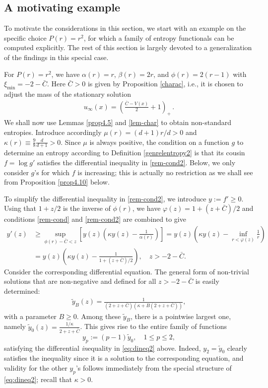 \documentclass[reqno]{amsart}
\begin{document}
\subsection{A motivating example}
\label{sct:xmp-pme2}
To motivate the considerations in this section, we start with an example on the specific choice $P(r)=r^2$, for which a family of entropy functionals can be computed explicitly. The rest of this section is largely devoted to a generalization of the findings in this special case.

For $P(r)=r^2$, we have $\alpha(r)=r$, $\beta(r)=2r$, and $\phi(r)=2(r-1)$ with $\xi_\text{min}=-2-\bar C$. 
Here $\bar C>0$ is given by Proposition \ref{charac}, i.e., it is chosen to adjust the mass of the stationary solution 
\begin{align}
\label{eq:PME2stst}
    u_\infty(x) = \left(\frac{\bar C-V(x)}{2}+1\right)_+\,.
\end{align}
We shall now use Lemmas \ref{prop4.5} and \ref{lem-char} to obtain non-standard entropies. Introduce accordingly $\mu(r)=(d+1)r/d>0$ and $\kappa(r)\equiv \frac98\frac{d}{d+1}>0$. Since $\mu$ is always positive, the condition on a function $g$ to determine an entropy according to Definition \ref{genrelentropy2} is that its cousin $f=\log g'$ satisfies the differential inequality in \eqref{rem-cond2}. Below, we only consider $g$'s for which $f$ is increasing; this is actually no restriction as we shall see from Proposition \ref{prop4.10} below. 

To simplify the differential inequality in \eqref{rem-cond2}, we introduce $y:=f'\ge0$. Using that $1+z/2$ is the inverse of $\phi(r)$, we have $\varphi(z)=1+(z+\bar C)/2$ and conditions \eqref{rem-cond} and \eqref{rem-cond2} are combined to give 
\begin{equation}
\label{eq:dineq2}
    \begin{split}
      y'(z)&\ge  \sup_{\phi(r)-\bar C<z}\left[y(z)\left(\kappa y(z)-\frac1{\alpha(r)}\right)\right] =
      y(z)\left(\kappa y(z) - \inf_{r<\varphi(z)}\frac1r\right) \\ &=y(z)\left(\kappa y(z) - \frac1{1+(z+\bar C)/2}\right),\quad z>-2-\bar C.
    \end{split}
\end{equation}
Consider the corresponding differential equation. The general form of non-trivial solutions that are non-negative and defined for all $z>-2-\bar C$ is easily determined:
\begin{align*}
    \tilde y_B(z) = \frac1{(2+z+\bar C)(\kappa+B(2+z+\bar C))},
\end{align*}
with a parameter $B\geq 0$. Among these $\tilde y_B$, there is a pointwise largest one, namely $\tilde y_0(z)=\frac{1/\kappa}{2+z+\bar C}$. This gives rise to the entire family of functions 
\[ y_p := (p-1)\tilde y_0, \quad 1\le p\le 2, \]
satisfying the differential \emph{in}equality in \eqref{eq:dineq2} above. Indeed, $y_2=\tilde y_0$ clearly satisfies the inequality since it is a solution to the corresponding equation, and validity for the other $y_p$'s follows immediately from the special structure of \eqref{eq:dineq2}; recall that $\kappa>0$.
\end{document}
